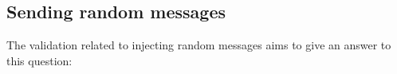 \subsection{Sending random messages}
%
%
%
%
The validation related to injecting random messages aims to give an answer to this question: 

